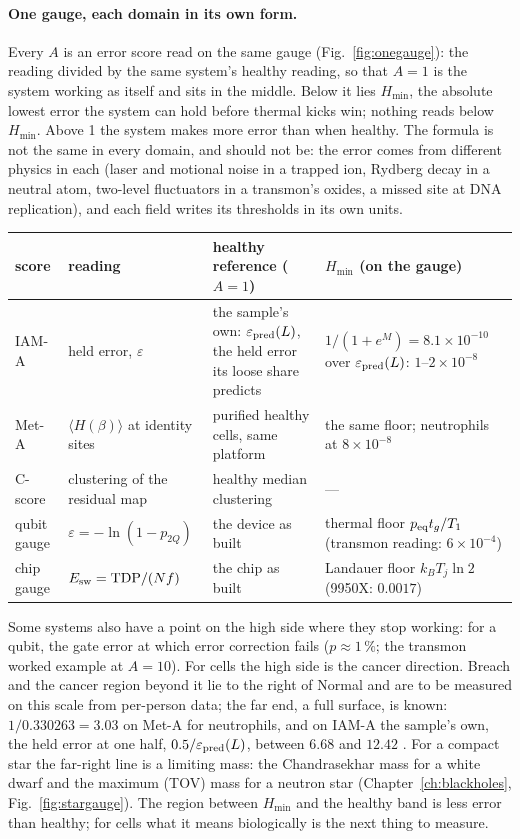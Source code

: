 \paragraph{One gauge, each domain in its own form.} Every $A$ is an error score read on the same gauge (Fig.~\ref{fig:onegauge}): the reading
divided by the same system's healthy reading, so that $A=1$ is the system working as itself and sits in the middle. Below it lies $H_{\min}$, the
absolute lowest error the system can hold before thermal kicks win; nothing reads below $H_{\min}$. Above 1 the system makes more error than when
healthy. The formula is not the same in every domain, and should not be: the error comes from different physics in each (laser and motional noise in a
trapped ion, Rydberg decay in a neutral atom, two-level fluctuators in a transmon's oxides, a missed site at DNA
replication), and each field writes its thresholds in its own units.
\begin{center}\small\begin{tabular}{p{}p{}p{}p{}}\toprule
score & reading & healthy reference ($A=1$) & $H_{\min}$ (on the gauge)\\\midrule
IAM-A & held error, $\varepsilon$ & the sample's own: $\varepsilon_{\rm pred}(L)$, the held error its loose share predicts & $1/(1+e^{M})=8.1\times10^{-10}$ over $\varepsilon_{\rm pred}(L)$: $1$--$2\times10^{-8}$\\
Met-A & $\langle H(\beta)\rangle$ at identity sites & purified healthy cells, same platform & the same floor; neutrophils at $8\times10^{-8}$\\
C-score & clustering of the residual map & healthy median clustering & ---\\
qubit gauge & $\varepsilon=-\ln(1-p_{2Q})$ & the device as built & thermal floor $p_{\rm eq}t_g/T_1$ (transmon reading: $6\times10^{-4}$)\\
chip gauge & $E_{\rm sw}=\mathrm{TDP}/(Nf)$ & the chip as built & Landauer floor $k_BT_j\ln2$ (9950X: $0.0017$)\\\bottomrule
\end{tabular}\end{center}
Some systems also have a point on the high side where they stop working: for a qubit, the gate error at which error correction fails ($p\approx1\,\%$;
the transmon worked example at $A=10$). For cells the high side is the cancer direction. Breach and the cancer region beyond it lie to the right of Normal and are to be measured on this scale from per-person data; the far end, a full
surface, is known: $1/0.330263=3.03$ on Met-A for neutrophils, and on IAM-A the sample's own, the held error at one half, $0.5/\varepsilon_{\rm pred}(L)$, between $6.68$ and $12.42$ \calc. For a compact star the far-right line is a
limiting mass: the Chandrasekhar mass for a white dwarf and the maximum (TOV) mass for a neutron star (Chapter~\ref{ch:blackholes}, Fig.~\ref{fig:stargauge}). The region between $H_{\min}$ and the healthy
band is less error than healthy; for cells what it means biologically is the next thing to measure.

